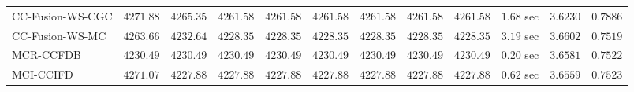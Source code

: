 \begin{table}[H]
\begin{tabular}{lrrrrrrrrrrr}
    CC-Fusion-WS-CGC & $      4271.88$ & $      4265.35$ & $      4261.58$ & $      4261.58$ & $      4261.58$ & $      4261.58$ & $      4261.58$ & $      4261.58$ & $         1.68$ sec    & $       3.6230$  & $       0.7886$ \\ 
     CC-Fusion-WS-MC & $      4263.66$ & $      4232.64$ & $      4228.35$ & $      4228.35$ & $      4228.35$ & $      4228.35$ & $      4228.35$ & $      4228.35$ & $         3.19$ sec    & $       3.6602$  & $       0.7519$ \\ 
\cmidrule{1-1} 
           MCR-CCFDB & $      4230.49$ & $      4230.49$ & $      4230.49$ & $      4230.49$ & $      4230.49$ & $      4230.49$ & $      4230.49$ & $      4230.49$ & $         0.20$ sec    & $       3.6581$  & $       0.7522$ \\ 
\cmidrule{1-1} 
           MCI-CCIFD & $      4271.07$ & $      4227.88$ & $      4227.88$ & $      4227.88$ & $      4227.88$ & $      4227.88$ & $      4227.88$ & $      4227.88$ & $         0.62$ sec    & $       3.6559$  & $       0.7523$ \\ 
\bottomrule
\end{tabular}
\end{table}

